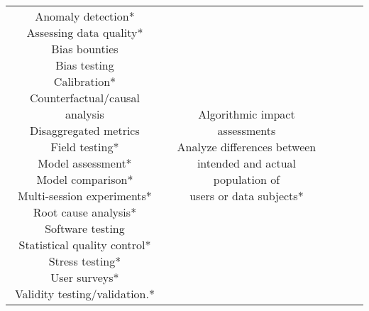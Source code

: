 \documentclass[fleqn]{article}
\begin{document}
\begin{landscape}
\begin{table}[H]
\begin{tabular}{|c|c|c|c|c|}
{			\textbullet\hspace{3pt} Anomaly detection*\\  	
			\textbullet\hspace{3pt} Assessing data quality*\\  	
			\textbullet\hspace{3pt} Bias bounties\\  	
			\textbullet\hspace{3pt} Bias testing\\  	
			\textbullet\hspace{3pt} Calibration*\\  	
			\textbullet\hspace{3pt} Counterfactual/causal analysis\\  	
			\textbullet\hspace{3pt} Disaggregated metrics\\  	
			\textbullet\hspace{3pt} Field testing*\\  	
			\textbullet\hspace{3pt} Model assessment*\\  	
			\textbullet\hspace{3pt} Model comparison*\\  	
			\textbullet\hspace{3pt} Multi-session experiments*\\  	
			\textbullet\hspace{3pt} Root cause analysis*\\  	
			\textbullet\hspace{3pt} Software testing\\  	
			\textbullet\hspace{3pt} Statistical quality control*\\  	
			\textbullet\hspace{3pt} Stress testing*\\  		
			\textbullet\hspace{3pt} User surveys*\\  		
			\textbullet\hspace{3pt} Validity testing/validation.*
		}
		&
		\makecell[l]{ 	
			\textbullet\hspace{3pt} Algorithmic impact assessments \\
			\textbullet\hspace{3pt} Analyze differences between \\\hspace{10pt}intended and actual population of \\\hspace{10pt}users or data subjects*\\ 
}
\end{tabular}
\end{table}
\end{landscape}
\end{document}
